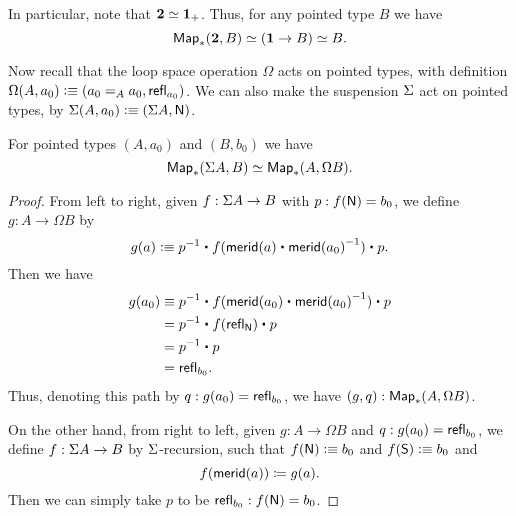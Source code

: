 In particular, note that $\eqv{\bool}{\unit_+}$.
Thus, for any pointed type $B$ we have
\[{\Map_*(\bool,B)} \simeq {(\unit \to B)}\simeq B.\]

Now recall that the loop space operation $\Omega$ acts on pointed types, with definition $\Omega(A,a_0) \defeq (\id[A]{a_0}{a_0},\refl{a_0})$.
We can also make the suspension $\susp$ act on pointed types, by $\susp(A,a_0)\defeq (\susp A,\north)$.

\begin{lem}\label{lem:susp-loop-adj}
  For pointed types $(A,a_0)$ and $(B,b_0)$ we have
  \[ \eqv{\Map_*(\susp A, B)}{\Map_*(A,\Omega B)}.\]
\end{lem}
\begin{proof}
  From left to right, given $f:\susp A \to B$ with $p:f(\north) = b_0$, we define $g:A \to \Omega B$ by
  \[g(a) \defeq \opp p \ct \ap f{\merid(a) \ct \opp{\merid(a_0)}} \ct p.\]
  Then we have
  \begin{align*}
    g(a_0) &\jdeq \opp p \ct \ap f{\merid(a_0) \ct \opp{\merid(a_0)}} \ct p\\
    &= \opp p \ct \ap f{\refl{\north}} \ct p\\
    &= \opp p \ct p\\
    &= \refl{b_0}.
  \end{align*}
  Thus, denoting this path by $q:g(a_0)=\refl{b_0}$, we have $(g,q):\Map_*(A,\Omega B)$.

  On the other hand, from right to left, given $g:A\to \Omega B$ and $q:g(a_0)=\refl{b_0}$, we define $f:\susp A \to B$ by $\susp$-recursion, such that $f(\north)\defeq b_0$ and $f(\south)\defeq b_0$ and
  \[ \ap f {\merid(a)} \defid g(a). \]
  Then we can simply take $p$ to be $\refl{b_0} : f(\north)= b_0$.


\end{proof}
